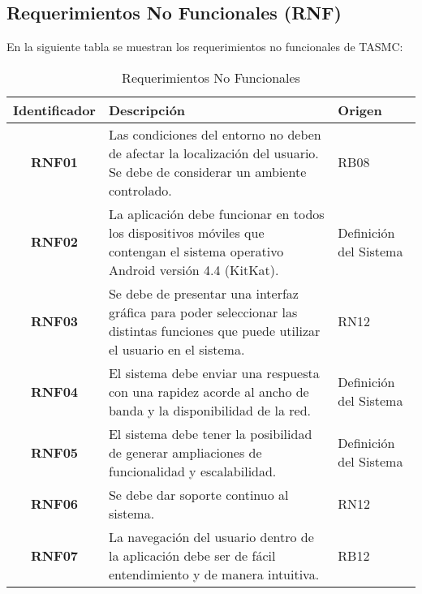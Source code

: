 \subsection{Requerimientos No Funcionales (RNF)}

En la siguiente tabla se muestran los requerimientos no funcionales de TASMC:

\begin{table}
	\begin{center}
		\begin{tabular}{|c|p{8.4cm}|p{2.5cm}|}
			\hline \rowcolor[RGB]{0,102,204} 
				\textcolor{blanco}{\bf Identificador} &
				\textcolor{blanco}{\bf Descripción} &
				\textcolor{blanco}{\bf Origen} \\
			\hline \rowcolor[RGB]{224,224,224} 
				\textbf{RNF01} &
				Las condiciones del entorno no deben de afectar la localización del usuario. Se debe de considerar un ambiente controlado. &
				RB08 \\
      		\hline 
      			\textbf{RNF02} &
				La aplicación debe funcionar en todos los dispositivos móviles que contengan el sistema operativo Android versión 4.4 (KitKat). &
				Definición del Sistema \\
			\hline \rowcolor[RGB]{224,224,224} 
				\textbf{RNF03} &
				Se debe de presentar una interfaz gráfica para poder seleccionar las distintas funciones que puede utilizar el usuario en el sistema. &
				RN12 \\ 
			\hline
				\textbf{RNF04} &
				El sistema debe enviar una respuesta con una rapidez acorde al ancho de banda y la disponibilidad de la red. &
				Definición del Sistema \\ 
			\hline \rowcolor[RGB]{224,224,224} 
				\textbf{RNF05} &
				El sistema debe tener la posibilidad de generar ampliaciones de funcionalidad y escalabilidad. &
				Definición del Sistema \\ 
			\hline
				\textbf{RNF06} &
				Se debe dar soporte continuo al sistema. &
				RN12 \\ 
			\hline \rowcolor[RGB]{224,224,224} 
				\textbf{RNF07} &
				La navegación del usuario dentro de la aplicación debe ser de fácil entendimiento y de manera intuitiva. &
				RB12 \\ 
			\hline
		\end{tabular}
	\end{center}
	\caption[Requerimientos No Funcionales]{Requerimientos No Funcionales} 
	\label{tab:reqNoFuncionales}
\end{table}